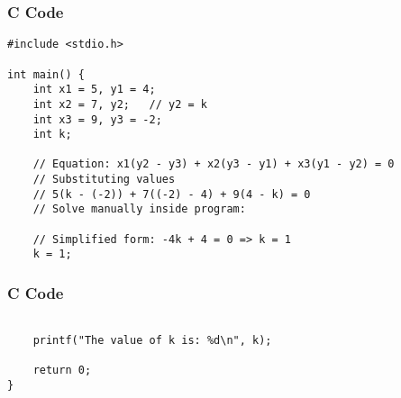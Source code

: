 \documentclass{beamer}
\begin{document}
\begin{frame}[fragile]
    \frametitle{C Code }

    \begin{lstlisting}
#include <stdio.h>

int main() {
    int x1 = 5, y1 = 4;
    int x2 = 7, y2;   // y2 = k
    int x3 = 9, y3 = -2;
    int k;

    // Equation: x1(y2 - y3) + x2(y3 - y1) + x3(y1 - y2) = 0
    // Substituting values
    // 5(k - (-2)) + 7((-2) - 4) + 9(4 - k) = 0
    // Solve manually inside program:

    // Simplified form: -4k + 4 = 0 => k = 1
    k = 1;
      \end{lstlisting}
\end{frame}

    \begin{frame}[fragile]
    \frametitle{C Code }

    \begin{lstlisting}

    printf("The value of k is: %d\n", k);

    return 0;
}

    \end{lstlisting}
\end{frame}
\end{document}
